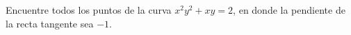 \setcounter{enumi}{42}
\item Encuentre todos los puntos de la curva $x^2y^2 + xy = 2$, en donde la pendiente de la recta tangente sea $-1$.

